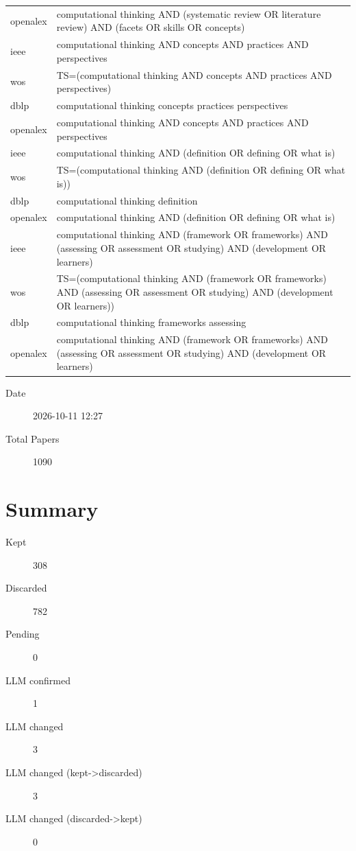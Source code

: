 \documentclass{article}
\begin{document}
\begin{longtable}{lp{10cm}}
openalex & \textquotedbl{}computational thinking\textquotedbl{} AND (\textquotedbl{}systematic review\textquotedbl{} OR \textquotedbl{}literature review\textquotedbl{}) AND (facets OR skills OR concepts) \\
ieee & \textquotedbl{}computational thinking\textquotedbl{} AND concepts AND practices AND perspectives \\
wos & TS=(\textquotedbl{}computational thinking\textquotedbl{} AND concepts AND practices AND perspectives) \\
dblp & computational thinking concepts practices perspectives \\
openalex & \textquotedbl{}computational thinking\textquotedbl{} AND concepts AND practices AND perspectives \\
ieee & \textquotedbl{}computational thinking\textquotedbl{} AND (definition OR defining OR \textquotedbl{}what is\textquotedbl{}) \\
wos & TS=(\textquotedbl{}computational thinking\textquotedbl{} AND (definition OR defining OR \textquotedbl{}what is\textquotedbl{})) \\
dblp & computational thinking definition \\
openalex & \textquotedbl{}computational thinking\textquotedbl{} AND (definition OR defining OR \textquotedbl{}what is\textquotedbl{}) \\
ieee & \textquotedbl{}computational thinking\textquotedbl{} AND (framework OR frameworks) AND (assessing OR assessment OR studying) AND (development OR learners) \\
wos & TS=(\textquotedbl{}computational thinking\textquotedbl{} AND (framework OR frameworks) AND (assessing OR assessment OR studying) AND (development OR learners)) \\
dblp & computational thinking frameworks assessing \\
openalex & \textquotedbl{}computational thinking\textquotedbl{} AND (framework OR frameworks) AND (assessing OR assessment OR studying) AND (development OR learners) \\
\bottomrule
\end{longtable}

\begin{description}
\item[Date] 2026-10-11 12:27
\item[Total Papers] 1090
\end{description}

\section{Summary}
\begin{description}
\item[Kept] 308
\item[Discarded] 782
\item[Pending] 0
\item[LLM confirmed] 1
\item[LLM changed] 3
\item[LLM changed (kept->discarded)] 3
\item[LLM changed (discarded->kept)] 0
\end{description}
\end{document}
